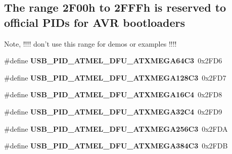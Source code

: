 \subsection*{The range 2\-F00h to 2\-F\-F\-Fh is reserved to official P\-I\-Ds for A\-V\-R bootloaders}
\label{_amgrp63dd31be8a71af76335a6cb0fbb010df}%
 Note, !!!! don't use this range for demos or examples !!!! \begin{DoxyCompactItemize}
\item 
\hypertarget{group__usb__atmel__ids__group_ga8fb5df64469efbd7ecc89d98d4c35e5e}{\#define {\bfseries U\-S\-B\-\_\-\-P\-I\-D\-\_\-\-A\-T\-M\-E\-L\-\_\-\-D\-F\-U\-\_\-\-A\-T\-X\-M\-E\-G\-A64\-C3}~0x2\-F\-D6}\label{group__usb__atmel__ids__group_ga8fb5df64469efbd7ecc89d98d4c35e5e}

\item 
\hypertarget{group__usb__atmel__ids__group_ga24c35d7245c5642f884c44cd55e841f4}{\#define {\bfseries U\-S\-B\-\_\-\-P\-I\-D\-\_\-\-A\-T\-M\-E\-L\-\_\-\-D\-F\-U\-\_\-\-A\-T\-X\-M\-E\-G\-A128\-C3}~0x2\-F\-D7}\label{group__usb__atmel__ids__group_ga24c35d7245c5642f884c44cd55e841f4}

\item 
\hypertarget{group__usb__atmel__ids__group_ga4fe74ce8623c164892a3b210280a5f00}{\#define {\bfseries U\-S\-B\-\_\-\-P\-I\-D\-\_\-\-A\-T\-M\-E\-L\-\_\-\-D\-F\-U\-\_\-\-A\-T\-X\-M\-E\-G\-A16\-C4}~0x2\-F\-D8}\label{group__usb__atmel__ids__group_ga4fe74ce8623c164892a3b210280a5f00}

\item 
\hypertarget{group__usb__atmel__ids__group_ga2b850577d49ceddbaedb505747bc212d}{\#define {\bfseries U\-S\-B\-\_\-\-P\-I\-D\-\_\-\-A\-T\-M\-E\-L\-\_\-\-D\-F\-U\-\_\-\-A\-T\-X\-M\-E\-G\-A32\-C4}~0x2\-F\-D9}\label{group__usb__atmel__ids__group_ga2b850577d49ceddbaedb505747bc212d}

\item 
\hypertarget{group__usb__atmel__ids__group_ga5787e9b21752badfdec0efd0c0e26c61}{\#define {\bfseries U\-S\-B\-\_\-\-P\-I\-D\-\_\-\-A\-T\-M\-E\-L\-\_\-\-D\-F\-U\-\_\-\-A\-T\-X\-M\-E\-G\-A256\-C3}~0x2\-F\-D\-A}\label{group__usb__atmel__ids__group_ga5787e9b21752badfdec0efd0c0e26c61}

\item 
\hypertarget{group__usb__atmel__ids__group_gab5aedc52c8a460640ea8e75dd1d7e807}{\#define {\bfseries U\-S\-B\-\_\-\-P\-I\-D\-\_\-\-A\-T\-M\-E\-L\-\_\-\-D\-F\-U\-\_\-\-A\-T\-X\-M\-E\-G\-A384\-C3}~0x2\-F\-D\-B}\label{group__usb__atmel__ids__group_gab5aedc52c8a460640ea8e75dd1d7e807}


\end{DoxyCompactItemize}
